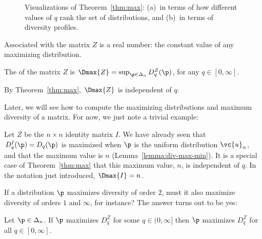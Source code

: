 \begin{figure}
\begin{center}
\begin{picture}
\end{picture}
\end{center}
\caption{Visualizations of Theorem~\ref{thm:max}: (a)~in terms of how
  different values of $q$ rank the set of distributions, and (b)~in terms
  of diversity profiles.}
\end{figure}

Associated with the matrix $Z$ is a real number: the constant value
of any maximizing distribution.

\begin{defn}
The  of the matrix $Z$ is $\Dmax{Z} =
\sup_{\p \in \Delta_n} D_q^Z(\p)$, for any $q \in [0, \infty]$.
\end{defn}

By Theorem~\ref{thm:max}, $\Dmax{Z}$ is independent of
$q$. 

Later, we will see how to compute the maximizing distributions and maximum
diversity of a matrix.  For now, we just note a trivial example:

\begin{example}
Let $Z$ be the $n \times n$ identity matrix $I$.  We have already seen that
$D_q^I(\p) = D_q(\p)$ is maximized when $\p$ is the uniform
distribution $\vc{u}_n$, and that the maximum value is $n$
(Lemma~\ref{lemma:div-max-min}).  It is a special case
of Theorem~\ref{thm:max} that this maximum value, $n$,
is independent of $q$.  In the notation just introduced, $\Dmax{I} = n$.
\end{example}

If a distribution $\p$ maximizes diversity of order $2$, must it also
maximize diversity of orders $1$ and $\infty$, for instance?  The answer
turns out to be yes:

\begin{cor}
Let $\p \in \Delta_n$.  If $\p$ maximizes $D_q^Z$ for some $q \in (0,
\infty]$ then $\p$ maximizes $D_q^Z$ for all $q \in [0, \infty]$.
\end{cor}

